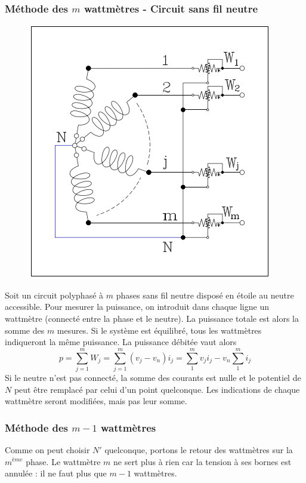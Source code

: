 \subsubsection{Méthode des $m$ wattmètres - Circuit sans fil neutre}
\begin{figure}
	\vspace{-11mm}
	\includegraphics[scale=0.4]{ch1/image11.png}
\end{figure}
Soit un circuit polyphasé à $m$ phases sans fil neutre disposé en 
étoile au neutre accessible. Pour mesurer la puissance, on introduit 
dans chaque ligne un wattmètre (connecté entre la phase et le neutre). 
La puissance totale est alors la somme des $m$ mesures. Si le système 
est équilibré, tous les wattmètres indiqueront la même puissance. La 
puissance débitée vaut alors
\begin{equation}
	p = \sum_{j=1}^m W_j = \sum_{j=1}^m (v_j-v_n)i_j = \sum_1^m v_ji_j -
	v_n\sum_1^m i_j
\end{equation}
Si le neutre n'est pas connecté, la somme des courants est nulle et le 
potentiel de $N$ peut être remplacé par celui d'un point quelconque. Les 
indications de chaque wattmètre seront modifiées, mais pas leur somme.
		
\subsubsection{Méthode des $m-1$ wattmètres}
Comme on peut choisir $N'$ quelconque, portons le retour des wattmètres 
sur la $m^{ème}$ phase. Le wattmètre $m$ ne sert plus à rien car la 
tension à ses bornes est annulée : il ne faut plus que $m-1$ wattmètres.
		
